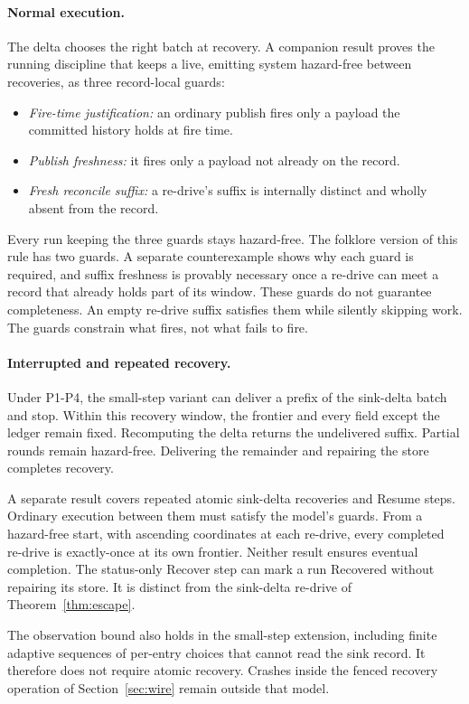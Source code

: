 \documentclass[sigplan,10pt]{acmart}
\theoremstyle{plain}
\theoremstyle{definition}
\newcommand{\Recovered}{\textsf{Recovered}}
\begin{document}
\paragraph{Normal execution.}
The delta chooses the right batch at recovery. A companion result
proves the running discipline that keeps a live, emitting system
hazard-free between recoveries, as three record-local guards:
\begin{itemize}
\item[G1.] \emph{Fire-time justification:} an ordinary publish fires
  only a payload the committed history holds at fire time.
\item[G2.] \emph{Publish freshness:} it fires only a payload not
  already on the record.
\item[G3.] \emph{Fresh reconcile suffix:} a re-drive's suffix is
  internally distinct and wholly absent from the record.
\end{itemize}
Every run keeping the three guards stays hazard-free. The folklore
version of this rule has two guards. A separate counterexample shows
why each guard is required, and
suffix freshness is provably necessary once a re-drive can meet a
record that already holds part of its window. These guards do not
guarantee completeness. An empty re-drive suffix satisfies them while
silently skipping work. The guards constrain what fires, not what
fails to fire.

\paragraph{Interrupted and repeated recovery.}
Under P1-P4, the small-step variant can deliver a prefix of the
sink-delta batch and stop. Within this recovery window, the frontier
and every field except the ledger remain fixed. Recomputing the delta
returns the undelivered suffix. Partial rounds remain hazard-free.
Delivering the remainder and repairing the store completes recovery.

A separate result covers repeated atomic sink-delta recoveries and
\textsf{Resume} steps. Ordinary execution between them must satisfy
the model's guards. From a hazard-free start,
with ascending coordinates at each re-drive, every completed re-drive
is exactly-once at its own frontier. Neither result ensures eventual
completion. The status-only \textsf{Recover} step can mark a run
\Recovered{} without repairing its store. It is distinct from the
sink-delta re-drive of Theorem~\ref{thm:escape}.

The observation bound also holds in the small-step extension,
including finite adaptive sequences of per-entry choices that cannot
read the sink record. It therefore does not require atomic recovery.
Crashes inside the fenced recovery operation of
Section~\ref{sec:wire} remain outside that model.
\end{document}
